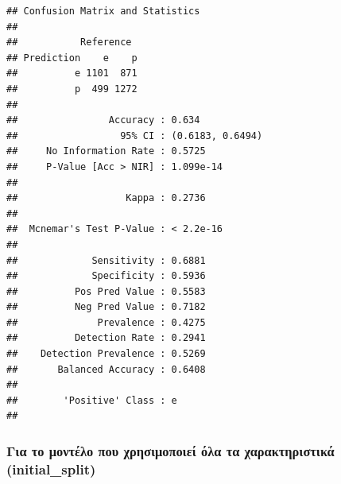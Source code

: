 \documentclass[
]{article}
\newenvironment{Shaded}{\begin{snugshade}}{\end{snugshade}}
\newcommand{\FunctionTok}[1]{\textcolor[rgb]{0.13,0.29,0.53}{\textbf{#1}}}
\newcommand{\NormalTok}[1]{#1}
\newcommand{\SpecialCharTok}[1]{\textcolor[rgb]{0.81,0.36,0.00}{\textbf{#1}}}
\begin{document}
\begin{Shaded}
\end{Shaded}

\begin{verbatim}
## Confusion Matrix and Statistics
## 
##           Reference
## Prediction    e    p
##          e 1101  871
##          p  499 1272
##                                           
##                Accuracy : 0.634           
##                  95% CI : (0.6183, 0.6494)
##     No Information Rate : 0.5725          
##     P-Value [Acc > NIR] : 1.099e-14       
##                                           
##                   Kappa : 0.2736          
##                                           
##  Mcnemar's Test P-Value : < 2.2e-16       
##                                           
##             Sensitivity : 0.6881          
##             Specificity : 0.5936          
##          Pos Pred Value : 0.5583          
##          Neg Pred Value : 0.7182          
##              Prevalence : 0.4275          
##          Detection Rate : 0.2941          
##    Detection Prevalence : 0.5269          
##       Balanced Accuracy : 0.6408          
##                                           
##        'Positive' Class : e               
## 
\end{verbatim}

\subsubsection*{Για το μοντέλο που χρησιμοποιεί όλα τα χαρακτηριστικά
(initial\_split)}\label{ux3b3ux3b9ux3b1-ux3c4ux3bf-ux3bcux3bfux3bdux3c4ux3adux3bbux3bf-ux3c0ux3bfux3c5-ux3c7ux3c1ux3b7ux3c3ux3b9ux3bcux3bfux3c0ux3bfux3b9ux3b5ux3af-ux3ccux3bbux3b1-ux3c4ux3b1-ux3c7ux3b1ux3c1ux3b1ux3baux3c4ux3b7ux3c1ux3b9ux3c3ux3c4ux3b9ux3baux3ac-initial_split}

\begin{Shaded}
\end{Shaded}
\end{document}
